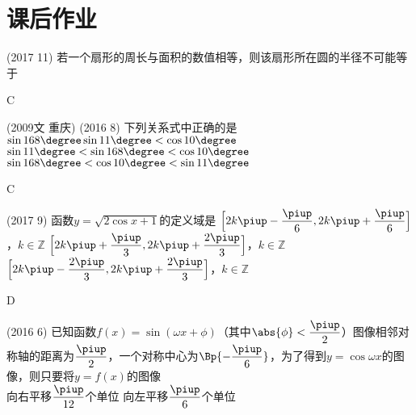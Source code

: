 \section{课后作业}
  \begin{exercise}
    \item%
      (2017  11)
      若一个扇形的周长与面积的数值相等，则该扇形所在圆的半径不可能等于\xz
      \begin{answer}
        C
      \end{answer}
    \item%
      {\kaishu (2009文 \textbullet 重庆)}
      (2016  8)
      下列关系式中正确的是\xz
       {$\sin168\degree\sin11\degree<\cos10\degree$}
       {$\sin11\degree<\sin168\degree<\cos10\degree$}
       {$\sin168\degree<\cos10\degree<\sin11\degree$}
      \begin{answer}
        C
      \end{answer}
    \item%
      (2017  9)
      函数$y=\sqrt{2\cos x+1}$的定义域是\xz
       {$\Bigl[2k\piup-\dfrac{\piup}6,2k\piup+\dfrac{\piup}6 \Bigr]$，$k\in\mathbb{Z}$}
       {$\Bigl[2k\piup+\dfrac{\piup}3,2k\piup+\dfrac{2\piup}3 \Bigr]$，$k\in\mathbb{Z}$}
       {$\Bigl[2k\piup-\dfrac{2\piup}3,2k\piup+\dfrac{2\piup}3 \Bigr]$，$k\in\mathbb{Z}$}
      \begin{answer}
        D
      \end{answer}
    \item%
      (2016  6)
      已知函数$f(x)=\sin(\omega x+\phi)$（其中$\abs{\phi}<\dfrac{\piup}2$）图像相邻对称轴的距离为$\dfrac{\piup}2$，一个对称中心为$\Bp{-\dfrac{\piup}6}$，为了得到$y=\cos\omega x$的图像，则只要将$y=f(x)$的图像\xz\\
       {向右平移$\dfrac{\piup}{12}$个单位}
       {向左平移$\dfrac{\piup}6$个单位}

\end{exercise}
